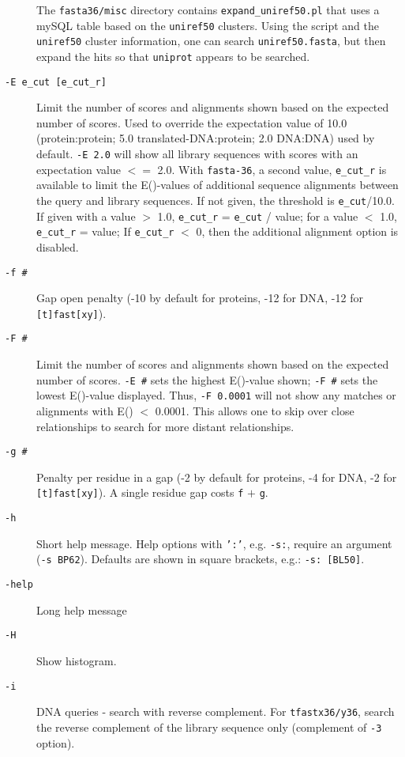 \documentclass[11pt]{article}
\begin{document}
\begin{description}
The \texttt{fasta36/misc} directory contains
\texttt{expand\_uniref50.pl} that uses a mySQL table based on the
\texttt{uniref50} clusters.  Using the script and the
\texttt{uniref50} cluster information, one can search
\texttt{uniref50.fasta}, but then expand the hits so that
\texttt{uniprot} appears to be searched.

\item[\texttt{-E e\_cut [e\_cut\_r]}] Limit the number of scores and
  alignments shown based on the expected number of scores.  Used to
  override the expectation value of 10.0 (protein:protein; 5.0
  translated-DNA:protein; 2.0 DNA:DNA) used by default.  \texttt{-E
    2.0} will show all library sequences with scores with an
  expectation value $<=$ 2.0.  With \texttt{fasta-36}, a second
  value, \texttt{e\_cut\_r} is available to limit the E()-values of
  additional sequence alignments between the query and library
  sequences.  If not given, the threshold is \texttt{e\_cut}/10.0.  If
  given with a value $>$ 1.0, \texttt{e\_cut\_r} = \texttt{e\_cut} /
  value; for a value $<$ 1.0, \texttt{e\_cut\_r} = value; If
  \texttt{e\_cut\_r} $<$ 0, then the additional alignment option is
  disabled.
\item[\texttt{-f \#}]
Gap open penalty (-10 by default for proteins,
-12 for DNA, -12 for \texttt{[t]fast[xy]}).
\item[\texttt{-F \#}]
Limit the number of scores and alignments shown based on the expected
number of scores. \texttt{-E \#} sets the highest E()-value shown; \texttt{-F \#} sets
the lowest E()-value displayed. Thus, \mbox{\texttt{-F 0.0001}} will not show any matches or
alignments with E() $<$ 0.0001.  This allows one to skip over close
relationships to search for more distant relationships.
\item[\texttt{-g \#}]
Penalty per residue in a gap (-2 by default for proteins,
-4 for DNA, -2 for \texttt{[t]fast[xy]}).  A single residue gap costs \texttt{f} $+$ \texttt{g}.
\item[\texttt{-h}]
Short help message. Help options with \texttt{':'}, e.g. \texttt{-s:},
require an argument (\texttt{-s BP62}).  Defaults are shown in square
brackets, e.g.: \texttt{-s:\ [BL50]}.
\item[\texttt{-help}]
Long help message
\item[\texttt{-H}]
Show histogram.
\item[\texttt{-i}]
DNA queries - search with reverse complement.  For 
\texttt{tfastx36/y36}, search the reverse complement of the library sequence
only (complement of \texttt{-3} option).

\end{description}
\end{document}
